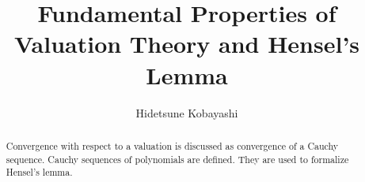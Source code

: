 \documentclass[11pt,a4paper]{report}
\begin{document}
\title{Fundamental Properties of Valuation Theory and Hensel's Lemma}
\author{Hidetsune Kobayashi}
\maketitle

\begin{abstract}
Convergence with respect to a valuation is discussed as
convergence of a Cauchy sequence. Cauchy sequences of polynomials are
defined. They are used to formalize Hensel's lemma.
\end{abstract}

\tableofcontents


\end{document}
